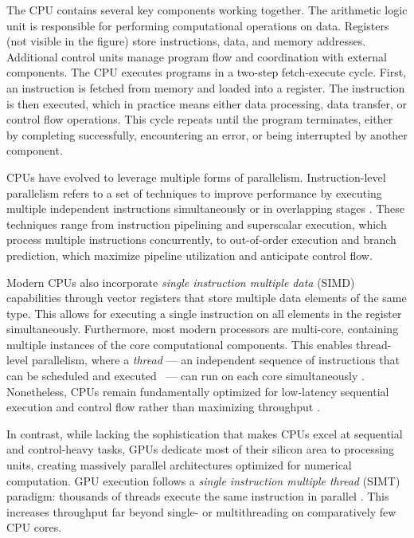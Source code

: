 \documentclass[english,12pt,a4paper,pdftex,sci,utf8]{aaltothesis}
\begin{document}
The CPU contains several key components working together. The arithmetic logic unit is responsible for performing computational operations on data. Registers (not visible in the figure) store instructions, data, and memory addresses. Additional control units manage program flow and coordination with external components. The CPU executes programs in a two-step fetch-execute cycle. First, an instruction is fetched from memory and loaded into a register. The instruction is then executed, which in practice means either data processing, data transfer, or control flow operations. This cycle repeats until the program terminates, either by completing successfully, encountering an error, or being interrupted by another component.

CPUs have evolved to leverage multiple forms of parallelism. Instruction-level parallelism refers to a set of techniques to improve performance by executing multiple independent instructions simultaneously or in overlapping stages \cite{hennessy2011computer, suomela_ppc}. These techniques range from instruction pipelining and superscalar execution, which process multiple instructions concurrently, to out-of-order execution and branch prediction, which maximize pipeline utilization and anticipate control flow.

Modern CPUs also incorporate \emph{single instruction multiple data} (SIMD) capabilities through vector registers that store multiple data elements of the same type. This allows for executing a single instruction on all elements in the register simultaneously. Furthermore, most modern processors are multi-core, containing multiple instances of the core computational components. This enables thread-level parallelism, where a \emph{thread} --- an independent sequence of instructions that can be scheduled and \mbox{executed \cite{stallings2011operating}} --- can run on each core simultaneously \cite{hennessy2011computer, suomela_ppc}. Nonetheless, CPUs remain fundamentally optimized for low-latency sequential execution and control flow rather than maximizing throughput \cite{hennessy2011computer, suomela_ppc}.

In contrast, while lacking the sophistication that makes CPUs excel at sequential and control-heavy tasks, GPUs dedicate most of their silicon area to processing units, creating massively parallel architectures optimized for numerical computation. GPU execution follows a \emph{single instruction multiple thread} (SIMT) paradigm: thousands of threads execute the same instruction in parallel \cite{cuda2025guide}. This increases throughput far beyond single- or multithreading on comparatively few CPU cores.
\end{document}

